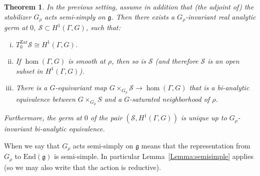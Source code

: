 \documentclass[a4paper,11pt]{article}
\newtheorem{Theorem}{Theorem}[section]
\newtheorem{Definition}[Theorem]{Definition}
\begin{document}
\begin{Theorem}
\label{Theorem:Slice}
In the previous setting, assume in addition that (the adjoint of) the stabilizer $G_\rho$ acts semi-simply on $\mathfrak g$. 
Then 
there exists a  $G_\rho$-invariant real analytic germ at $0$, $\mathcal S\subset H^1(\Gamma,G) $, such that:
\begin{enumerate}[(i)]
 \item $T^{\mathrm{Zar}}_0\mathcal S\cong H^1(\Gamma,G)$. 
 
 \item If $\hom(\Gamma, G)$ is smooth at $\rho$, then so is $\mathcal S$ (and therefore 
 $\mathcal S$ is an open subset in $H^1(\Gamma,G)$).
 \item There is a $G$-equivariant map 
 $G\times_{G_\rho}{\mathcal S}\to \hom(\Gamma, G)$ that is a bi-analytic equivalence between $G\times_{G_\rho}S$
 and a $G$-saturated neighborhood of $\rho$.
\end{enumerate}
Furthermore, the germ at $0$ 
of the pair  $(\mathcal S, H^1(\Gamma, G)  )$ is unique up to 
 $G_\rho$-invariant bi-analytic equivalence.
\end{Theorem}


When we say that $G_\rho$ acts semi-simply on $\mathfrak g$ means that the representation from $G_\rho$ to $\mathrm{End}(\mathfrak{g})$ is semi-simple.
In particular Lemma~\ref{Lemma:semisimple} applies (so we may also write that
the action is reductive).

% 
\end{document}
